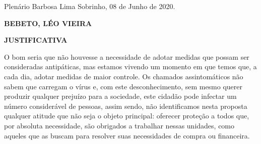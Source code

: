 \documentclass[10pt]{article}
\begin{document}
\begin{center}
  Plenário Barbosa Lima Sobrinho, 08 de Junho de 2020.

   \bigskip

  \textbf{ BEBETO, LÉO VIEIRA}

  \bigskip

  \textbf{JUSTIFICATIVA}
  \bigskip

\end{center}

  O bom seria que não houvesse a necessidade de adotar medidas que possam ser consideradas antipáticas, mas estamos vivendo um momento em que temos que, a cada dia, adotar medidas de maior controle. Os chamados assintomáticos não sabem que carregam o vírus e, com este desconhecimento, sem mesmo querer produzir qualquer prejuízo para a sociedade, este cidadão pode infectar um número considerável de pessoas, assim sendo, não identificamos nesta proposta qualquer atitude que não seja o objeto principal: oferecer proteção a todos que, por absoluta necessidade, são obrigados a trabalhar nessas unidades, como aqueles que as buscam para resolver suas necessidades de compra ou financeira. 



\iffalse
\begin{center}
  \textbf{REFERÊNCIAS}
\end{center}


\fi
\end{document}
